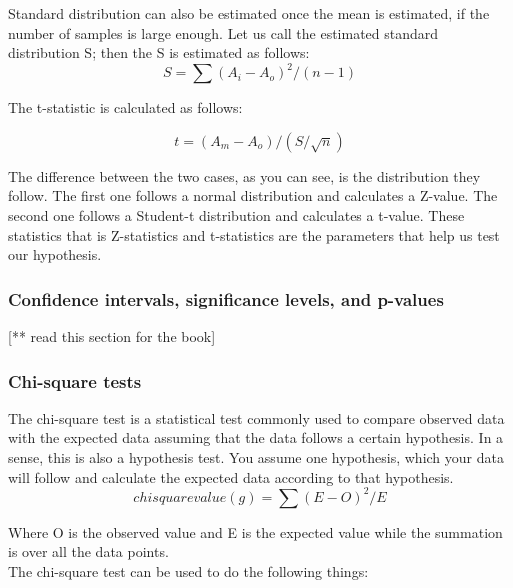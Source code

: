 \documentclass{article}
\numberwithin{equation}{section} %
\begin{document}
Standard distribution can also be estimated once the mean is estimated, if
the number of samples is large enough. Let us call the estimated standard
distribution S; then the S is estimated as follows: \\

\begin{equation*}
S = \sum (A_i-A_o)^2 / (n-1)
\end{equation*}

The t-statistic is calculated as follows:

\begin{equation}
t = (A_m - A_o) / (S/\sqrt{n})
\end{equation}

The difference between the two cases, as you can see, is the distribution they follow. The first one follows a normal distribution and calculates a Z-value. The second one follows a Student-t distribution and calculates a t-value. These statistics that is Z-statistics and t-statistics are the parameters that help us test our hypothesis. \\

\subsubsection*{Confidence intervals, significance levels, and p-values}

[** read this section for the book]


\subsubsection*{Chi-square tests}

The chi-square test is a statistical test commonly used to compare observed data with the expected data assuming that the data follows a certain hypothesis. In a sense, this is also a hypothesis test. You assume one hypothesis, which your data will follow and calculate the expected data according to that hypothesis. \\

\begin{equation*}
chisquare value(g) = \sum(E-O)^2/E
\end{equation*}

Where O is the observed value and E is the expected value while the summation is
over all the data points. \\

The chi-square test can be used to do the following things: \\
\end{document}
